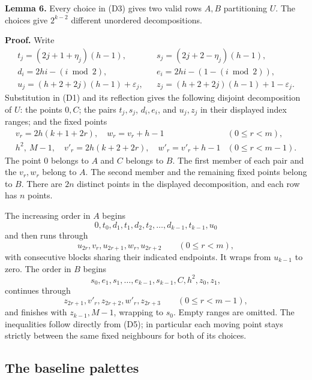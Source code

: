 \documentclass[11pt,a4paper]{article}
\newcommand{\statementstart}{\par\addvspace{6pt plus 1pt minus 1pt}\noindent}
\newcommand{\labelledparagraphstart}{\par\addvspace{3pt plus 1pt minus 1pt}\noindent}
\begin{document}
\statementstart\textbf{Lemma 6.} Every choice in (D3) gives two valid rows \(A,B\) partitioning \(U\). The choices give \(2^{k-2}\) different unordered decompositions.

\labelledparagraphstart\textbf{Proof.} Write \begin{equation}
\begin{array}{lll}
 t_j=(2j+1+\eta_j)(h-1),&&s_j=(2j+2-\eta_j)(h-1),\\
 d_i=2hi-(i\bmod2),&&e_i=2hi-(1-(i\bmod2)),\\
 u_j=(h+2+2j)(h-1)+\varepsilon_j,&&
 z_j=(h+2+2j)(h-1)+1-\varepsilon_j.
\end{array}
\tag{D5}\label{eq:D5}
\end{equation} Substitution in (D1) and its reflection gives the following disjoint decomposition of \(U\): the points \(0,C\); the pairs \(t_j,s_j\), \(d_i,e_i\), and \(u_j,z_j\) in their displayed index ranges; and the fixed points \[
\begin{array}{ll}
 v_r=2h(k+1+2r),\quad w_r=v_r+h-1 &(0\leq r<m),\\
 h^2,\ M-1,\quad v'_r=2h(k+2+2r),\quad w'_r=v'_r+h-1
 &(0\leq r<m-1).
\end{array}
\] The point \(0\) belongs to \(A\) and \(C\) belongs to \(B\). The first member of each pair and the \(v_r,w_r\) belong to \(A\). The second member and the remaining fixed points belong to \(B\). There are \(2n\) distinct points in the displayed decomposition, and each row has \(n\) points.

The increasing order in \(A\) begins \[
 0,t_0,d_1,t_1,d_2,t_2,\ldots,d_{k-1},t_{k-1},u_0
\] and then runs through \begin{equation}
u_{2r},v_r,u_{2r+1},w_r,u_{2r+2}\qquad(0\leq r<m),
\tag{D6}\label{eq:D6}
\end{equation} with consecutive blocks sharing their indicated endpoints. It wraps from \(u_{k-1}\) to zero. The order in \(B\) begins \[
 s_0,e_1,s_1,\ldots,e_{k-1},s_{k-1},C,h^2,z_0,z_1,
\] continues through \begin{equation}
z_{2r+1},v'_r,z_{2r+2},w'_r,z_{2r+3}\qquad(0\leq r<m-1),
\tag{D7}\label{eq:D7}
\end{equation} and finishes with \(z_{k-1},M-1\), wrapping to \(s_0\). Empty ranges are omitted. The inequalities follow directly from (D5); in particular each moving point stays strictly between the same fixed neighbours for both of its choices.

\hypertarget{the-baseline-palettes}{%
\subsection{The baseline palettes}\label{the-baseline-palettes}}
\end{document}
